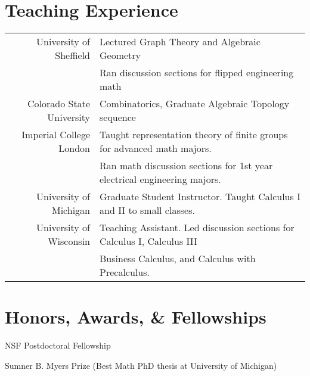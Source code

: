 \documentclass[11pt,letterpaper]{article}
\renewenvironment{itemize}{
  \begin{list}{}{
    \setlength{\leftmargin}{1.5em}
  }
}{
  \end{list}
}
\begin{document}
\section*{Teaching Experience}
\begin{tabular}{rl}
University of Sheffield & Lectured Graph Theory and Algebraic Geometry \\
& Ran discussion sections for flipped engineering math \\
\rule{0pt}{3ex}Colorado State University & Combinatorics, Graduate Algebraic Topology sequence \\
\rule{0pt}{3ex}Imperial College London & Taught representation theory of finite groups for advanced math majors.  \\
& Ran math discussion sections for 1st year electrical engineering majors. \\
\rule{0pt}{3ex}University of Michigan & Graduate Student Instructor. Taught Calculus I and II to small classes. \\
\rule{0pt}{3ex}University of Wisconsin &  Teaching Assistant. Led discussion sections for Calculus I, Calculus III \\
&  Business Calculus, and Calculus with Precalculus. \\
\end{tabular}


\section*{Honors, Awards, \& Fellowships}

\begin{itemize}
\item NSF Postdoctoral Fellowship
\item Sumner B. Myers Prize (Best Math PhD thesis at University of Michigan)
\end{itemize}
\end{document}
